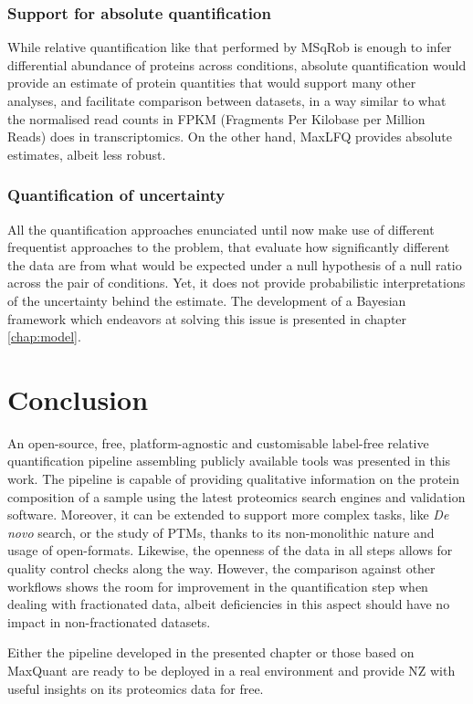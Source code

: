\subsubsection{Support for absolute quantification}

While relative quantification like that performed by MSqRob is enough to infer differential abundance of proteins across conditions, absolute quantification would provide an estimate of protein quantities that would support many other analyses, and facilitate comparison between datasets, in a way similar to what the normalised read counts in FPKM (Fragments Per Kilobase per Million Reads) does in transcriptomics. On the other hand, MaxLFQ provides absolute estimates, albeit less robust.

\subsubsection{Quantification of uncertainty}

All the quantification approaches enunciated until now make use of different frequentist approaches to the problem, that evaluate how significantly different the data are from what would be expected under a null hypothesis of a null ratio across the pair of conditions. Yet, it does not provide probabilistic interpretations of the uncertainty behind the estimate. The development of a Bayesian framework which endeavors at solving this issue is presented in chapter \ref{chap:model}.


\section{Conclusion}

An open-source, free, platform-agnostic and customisable label-free relative quantification pipeline assembling publicly available tools was presented in this work. The pipeline is capable of providing qualitative information on the protein composition of a sample using the latest proteomics search engines and validation software. Moreover, it can be extended to support more complex tasks, like \textit{De novo} search, or the study of \ac{PTM}s, thanks to its non-monolithic nature and usage of open-formats. Likewise, the openness of the data in all steps allows for quality control checks along the way. However, the comparison against other workflows shows the room for improvement in the quantification step when dealing with fractionated data, albeit deficiencies in this aspect should have no impact in non-fractionated datasets.

Either the pipeline developed in the presented chapter or those based on MaxQuant are ready to be deployed in a real environment and provide \ac{NZ} with useful insights on its proteomics data for free.